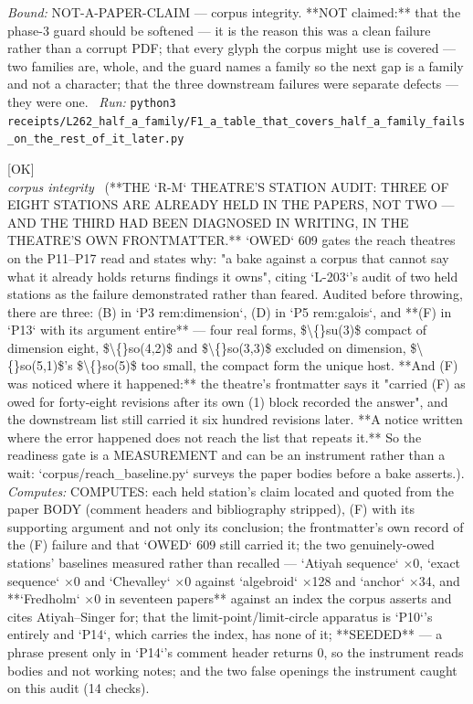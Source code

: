 \begin{description}
 \emph{Bound:} NOT-A-PAPER-CLAIM --- corpus integrity. **NOT claimed:** that the phase-3 guard should be softened --- it is the reason this was a clean failure rather than a corrupt PDF; that every glyph the corpus might use is covered --- two families are, whole, and the guard names a family so the next gap is a family and not a character; that the three downstream failures were separate defects --- they were one.
\ \emph{Run:} \texttt{python3 receipts/L262\_half\_a\_family/F1\_a\_table\_that\_covers\_half\_a\_family\_fails\_on\_the\_rest\_of\_it\_later.py}
\item[\label{rcpt:S1_three_of_eight_stations_are_already_held_and_one_was_noticed_and_not_propagated}\texttt{S1\_three\_of\_eight\_stations\_are\_already\_held\_and\_one\_was\_noticed\_and\_not\_propagated}]\hfill\textsf{[OK]}\\
\textit{corpus integrity} \ (**THE `R-M` THEATRE'S STATION AUDIT: THREE OF EIGHT STATIONS ARE ALREADY HELD IN THE PAPERS, NOT TWO --- AND THE THIRD HAD BEEN DIAGNOSED IN WRITING, IN THE THEATRE'S OWN FRONTMATTER.** `OWED` 609 gates the reach theatres on the P11--P17 read and states why: "a bake against a corpus that cannot say what it already holds returns findings it owns", citing `L-203`'s audit of two held stations as the failure demonstrated rather than feared. Audited before throwing, there are three: (B) in `P3 rem:dimension`, (D) in `P5 rem:galois`, and **(F) in `P13` with its argument entire** --- four real forms, \$\textbackslash\{\}su(3)\$ compact of dimension eight, \$\textbackslash\{\}so(4,2)\$ and \$\textbackslash\{\}so(3,3)\$ excluded on dimension, \$\textbackslash\{\}so(5,1)\$'s \$\textbackslash\{\}so(5)\$ too small, the compact form the unique host. **And (F) was noticed where it happened:** the theatre's frontmatter says it "carried (F) as owed for forty-eight revisions after its own (1) block recorded the answer", and the downstream list still carried it six hundred revisions later. **A notice written where the error happened does not reach the list that repeats it.** So the readiness gate is a MEASUREMENT and can be an instrument rather than a wait: `corpus/reach\_baseline.py` surveys the paper bodies before a bake asserts.). 
\emph{Computes:} COMPUTES: each held station's claim located and quoted from the paper BODY (comment headers and bibliography stripped), (F) with its supporting argument and not only its conclusion; the frontmatter's own record of the (F) failure and that `OWED` 609 still carried it; the two genuinely-owed stations' baselines measured rather than recalled --- `Atiyah sequence` \ensuremath{\times}0, `exact sequence` \ensuremath{\times}0 and `Chevalley` \ensuremath{\times}0 against `algebroid` \ensuremath{\times}128 and `anchor` \ensuremath{\times}34, and **`Fredholm` \ensuremath{\times}0 in seventeen papers** against an index the corpus asserts and cites Atiyah--Singer for; that the limit-point/limit-circle apparatus is `P10`'s entirely and `P14`, which carries the index, has none of it; **SEEDED** --- a phrase present only in `P14`'s comment header returns 0, so the instrument reads bodies and not working notes; and the two false openings the instrument caught on this audit (14 checks).

\end{description}
